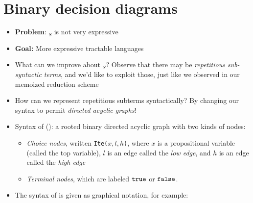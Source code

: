 \documentclass{tufte-handout}
\begin{document}
\section{Binary decision diagrams}
\begin{itemize}
  \item \textbf{Problem}: \prop$_S${} is not very expressive
  \item \textbf{Goal:} More expressive tractable languages
  \item What can we improve about \prop$_S$? Observe that there may be 
  \emph{repetitious sub-syntactic terms}, and we'd like to exploit those, just
  like we observed in our memoized reduction scheme
  \item How can we represent repetitious subterms syntactically? By changing our 
  syntax to permit \emph{directed acyclic graphs}!
  \item Syntax of  (\bdd{}): a rooted binary directed acyclic graph 
  with two kinds of nodes:
  \begin{itemize}
    \item \emph{Choice nodes}, written \texttt{Ite($x, l, h$)}, where $x$ is a
    propositional variable (called the top variable), $l$ is an edge called the \emph{low edge}, and 
    $h$ is an edge called the \emph{high edge}
    \item \emph{Terminal nodes}, which are labeled $\texttt{true}$ or $\texttt{false}$.
  \end{itemize}
  \item The syntax of \bdd{} is given as graphical notation, for example:

\end{itemize}
\end{document}
